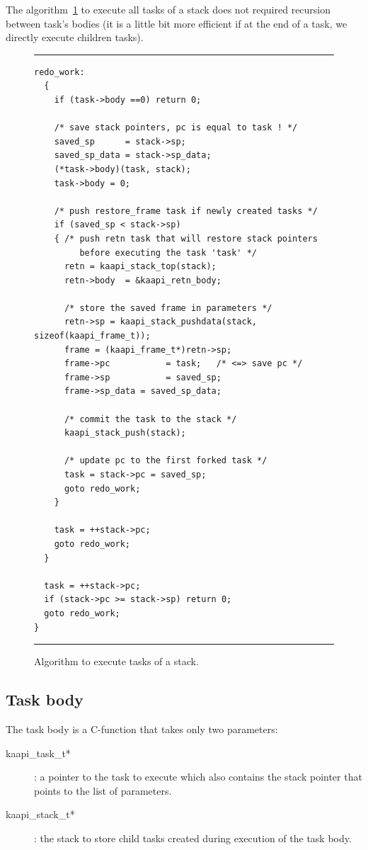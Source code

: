 \documentclass[12pt]{report}
\begin{document}
The algorithm~\ref{fig:stackalgo} to execute all tasks of a stack does not required recursion between task's bodies (it is a little bit more efficient if at the end of a task, we directly execute children tasks).
\begin{figure}
\hrule
{\small
\begin{verbatim}
redo_work: 
  {
    if (task->body ==0) return 0;
    
    /* save stack pointers, pc is equal to task ! */
    saved_sp      = stack->sp;
    saved_sp_data = stack->sp_data;
    (*task->body)(task, stack);
    task->body = 0;
    
    /* push restore_frame task if newly created tasks */
    if (saved_sp < stack->sp) 
    { /* push retn task that will restore stack pointers 
         before executing the task 'task' */
      retn = kaapi_stack_top(stack);
      retn->body  = &kaapi_retn_body;

      /* store the saved frame in parameters */
      retn->sp = kaapi_stack_pushdata(stack, sizeof(kaapi_frame_t));
      frame = (kaapi_frame_t*)retn->sp;
      frame->pc           = task;   /* <=> save pc */
      frame->sp           = saved_sp; 
      frame->sp_data = saved_sp_data;

      /* commit the task to the stack */
      kaapi_stack_push(stack);

      /* update pc to the first forked task */
      task = stack->pc = saved_sp;
      goto redo_work;
    }
       
    task = ++stack->pc;
    goto redo_work;
  }

  task = ++stack->pc;
  if (stack->pc >= stack->sp) return 0;
  goto redo_work;
}
\end{verbatim}
}
\caption{Algorithm to execute tasks of a stack.}
\vspace*{1ex}
\hrule
\label{fig:stackalgo}
\end{figure}

\subsection{Task body}

The task body is a C-function that takes only two parameters:
\begin{description}
\item [kaapi\_task\_t*]: a pointer to the task to execute which also contains the stack pointer that points to the list of parameters.
\item [kaapi\_stack\_t*]: the stack to store child  tasks created during execution of the task body.
\end{description}
\end{document}
